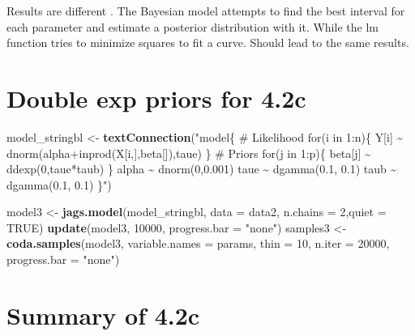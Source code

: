 \documentclass[
]{article}
\newenvironment{Shaded}{\begin{snugshade}}{\end{snugshade}}
\newcommand{\AttributeTok}[1]{\textcolor[rgb]{0.13,0.29,0.53}{#1}}
\newcommand{\ConstantTok}[1]{\textcolor[rgb]{0.56,0.35,0.01}{#1}}
\newcommand{\DecValTok}[1]{\textcolor[rgb]{0.00,0.00,0.81}{#1}}
\newcommand{\FunctionTok}[1]{\textcolor[rgb]{0.13,0.29,0.53}{\textbf{#1}}}
\newcommand{\NormalTok}[1]{#1}
\newcommand{\OtherTok}[1]{\textcolor[rgb]{0.56,0.35,0.01}{#1}}
\newcommand{\SpecialCharTok}[1]{\textcolor[rgb]{0.81,0.36,0.00}{\textbf{#1}}}
\newcommand{\StringTok}[1]{\textcolor[rgb]{0.31,0.60,0.02}{#1}}
\begin{document}
Results are different . The Bayesian model attempts to find the best
interval for each parameter and estimate a posterior distribution with
it. While the lm function tries to minimize squares to fit a curve.
Should lead to the same results.

\section{Double exp priors for 4.2c}\label{double-exp-priors-for-4.2c}

\begin{Shaded}
\begin{Highlighting}[]
\NormalTok{ model\_stringbl }\OtherTok{\textless{}{-}} \FunctionTok{textConnection}\NormalTok{(}\StringTok{"model\{}
\StringTok{   \# Likelihood}
\StringTok{    for(i in 1:n)\{}
\StringTok{      Y[i] \textasciitilde{} dnorm(alpha+inprod(X[i,],beta[]),taue)}
\StringTok{    \}}
\StringTok{   \# Priors}
\StringTok{    for(j in 1:p)\{}
\StringTok{      beta[j] \textasciitilde{} ddexp(0,taue*taub)}
\StringTok{    \}}
\StringTok{    alpha \textasciitilde{} dnorm(0,0.001)}
\StringTok{    taue  \textasciitilde{} dgamma(0.1, 0.1)}
\StringTok{    taub  \textasciitilde{} dgamma(0.1, 0.1)}
\StringTok{ \}"}\NormalTok{)}

\NormalTok{model3 }\OtherTok{\textless{}{-}} \FunctionTok{jags.model}\NormalTok{(model\_stringbl, }\AttributeTok{data =}\NormalTok{ data2, }\AttributeTok{n.chains =} \DecValTok{2}\NormalTok{,}\AttributeTok{quiet =} \ConstantTok{TRUE}\NormalTok{)}
\FunctionTok{update}\NormalTok{(model3, }\DecValTok{10000}\NormalTok{, }\AttributeTok{progress.bar =} \StringTok{"none"}\NormalTok{)}
\NormalTok{samples3 }\OtherTok{\textless{}{-}} \FunctionTok{coda.samples}\NormalTok{(model3, }\AttributeTok{variable.names =}\NormalTok{ params, }\AttributeTok{thin =} \DecValTok{10}\NormalTok{, }\AttributeTok{n.iter =} \DecValTok{20000}\NormalTok{, }\AttributeTok{progress.bar =} \StringTok{"none"}\NormalTok{)}
\end{Highlighting}
\end{Shaded}

\section{Summary of 4.2c}\label{summary-of-4.2c}

\begin{Shaded}
\end{Shaded}
\end{document}
